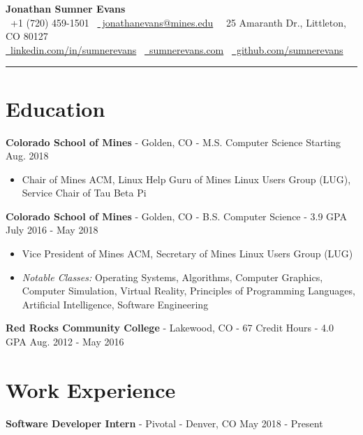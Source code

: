 \documentclass[10pt,letterpaper]{article}
\begin{document}
\begin{center}
    {\huge\textbf{Jonathan Sumner Evans}} \\
    \vspace{3pt}
    \faPhone\ +1 (720) 459-1501
    \textbar\ \href{mailto:jonathanevans@mines.edu}{\faEnvelope\ jonathanevans@mines.edu}
    \textbar\ \faHome\ 25 Amaranth Dr., Littleton, CO 80127 \\
    \href{https://www.linkedin.com/in/sumnerevans}{\faLinkedin\
    linkedin.com/in/sumnerevans}
    \textbar\ \href{http://sumnerevans.com}{\faGlobe\ sumnerevans.com}
    \textbar\ \href{https://github.com/sumnerevans}{\faGithub\
    github.com/sumnerevans}
    \rule{\textwidth}{0.5pt}
\end{center}

\section*{Education}
\textbf{Colorado School of Mines} - Golden, CO - M.S. Computer Science
\hfill Starting Aug. 2018
\begin{itemize}
    \item Chair of Mines ACM, Linux Help Guru of Mines Linux Users Group (LUG),
        Service Chair of Tau Beta Pi
\end{itemize}

\textbf{Colorado School of Mines} - Golden, CO - B.S. Computer Science - 3.9 GPA
\hfill July 2016 - May 2018
\begin{itemize}
    \item Vice President of Mines ACM, Secretary of Mines Linux Users Group
        (LUG)
    \item \textit{Notable Classes:} Operating Systems, Algorithms, Computer
        Graphics, Computer Simulation, Virtual Reality, Principles of
        Programming Languages, Artificial Intelligence, Software Engineering
\end{itemize}

\vspace{2pt}
\textbf{Red Rocks Community College} - Lakewood, CO - 67 Credit Hours - 4.0 GPA
\hfill Aug. 2012 - May 2016

\section*{Work Experience}
\textbf{Software Developer Intern} - Pivotal - Denver, CO
\hfill May 2018 - Present
\end{document}
